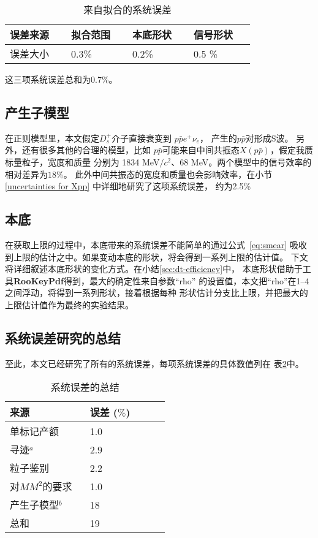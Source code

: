 \begin{table}[htbp]
    \caption{来自拟合的系统误差}%
    \label{tab:sys-uncerainty-fitting}
    \centering
    \begin{tabular}{p{0.2 \linewidth} p{0.2 \linewidth} p{0.2 \linewidth} 
        p{0.2 \linewidth}}
        \toprule
        误差来源 & 拟合范围 & 本底形状 & 信号形状\\
        \midrule
        误差大小 & 0.3\%  & 0.2\%  & 0.5 \%  \\ 
        \bottomrule
    \end{tabular}
\end{table}
这三项系统误差总和为0.7\%。
\subsection{产生子模型}
在正则模型里，本文假定$D_{s}^{+}$介子直接衰变到
$p\bar{p}e^{+} \nu_{e}$， 产生的$p\bar{p}$对形成S波。
另外，还有很多其他的合理的模型，比如
$p\bar{p}$可能来自中间共振态$X(p\bar{p})$，假定我赝标量粒子，宽度和质量
分别为
1834 MeV$/c^{2}$、68 MeV。两个模型中的信号效率的相对差异为$18\%$。
此外中间共振态的宽度和质量也会影响效率，在小节\ref{uncertainties for Xpp}
中详细地研究了这项系统误差，
约为2.5\%

\subsection{本底}%
\label{sec:deal_with_background}
在获取上限的过程中，本底带来的系统误差不能简单的通过公式~\ref{eq:smear}
吸收到上限的估计之中。如果变动本底的形状，将会得到一系列上限的估计值。
下文将详细叙述本底形状的变化方式。在小结\ref{sec:dt-efficiency}中，
本底形状借助于工具\textbf{RooKeyPdf}得到，最大的确定性来自参数``rho''
的设置值，本文把``rho''在1--4之间浮动，将得到一系列形状，接着根据每种
形状估计分支比上限，并把最大的上限估计值作为最终的实验结果。

\subsection*{系统误差研究的总结}
至此，本文已经研究了所有的系统误差，每项系统误差的具体数值列在
表\ref{tab:short_summary}中。

\begin{table}[htbp]
    \caption{系统误差的总结}%
    \label{tab:short_summary}
    \centering
    \begin{tabular}{p{0.45 \linewidth} p{0.45 \linewidth} }
        \toprule
        来源 & 误差 ($\%$) \\ 
        \midrule
        单标记产额       & 1.0 \\
        寻迹$^{a}$       & 2.9 \\
        粒子鉴别         & 2.2 \\
        对$MM^{2}$的要求 & 1.0 \\
        产生子模型$^{b}$ & 18 \\
        \midrule
        总和 & 19 \\
        \bottomrule
    \end{tabular}
\end{table}

